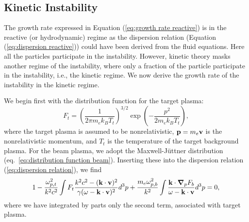 \documentclass[usenatbib,iop,apj,numberedappendix]{aeb_emulateapj_2015}
\newcommand\bmath[1] {\mbox{\boldmath$\rm #1$}}
\newcommand{\vel}{\ensuremath{\bmath{v}}}
\newcommand{\pmom}{\ensuremath{\bmath{p}}}
\newcommand{\gradp}{\ensuremath{\bmath{\nabla}_p}}
\newcommand{\betavec}{\ensuremath{\bmath{\beta}}}
\newcommand{\kvec}{\ensuremath{\bmath{k}}}
\newcommand{\betabeam}{\ensuremath{\bmath{\beta}_{\rm b}}}
\newcommand{\gammabeam}{\ensuremath{\gamma_{\rm b}}}
\begin{document}
\subsection{Kinetic Instability}

The growth rate expressed in Equation (\ref{eq:growth rate reactive}) is in the reactive (or hydrodynamic) regime as the dispersion relation (Equation (\ref{eq:dispersion reactive})) could have been derived from the fluid equations.  Here all the particles participate in the instability.  However, kinetic theory masks another regime of the instability, where only a fraction of the particle participate in the instability, i.e., the kinetic regime.  We now derive the growth rate of the instability in the kinetic regime.  

We begin first with the distribution function for the target plasma:
\begin{equation}
 F_t = \left(\frac{1}{2\pi m_e k_B T_t}\right)^{3/2}\exp\left(-\frac{p^2}{2m_e k_B T_t}\right),
\end{equation}
where the target plasma is assumed to be nonrelativistic, $\bmath{p}=m_e\vel$ is the nonrelativistic momentum,  and $T_t$ is the temperature of the target background plasma.
For the beam plasma, we adopt the Maxwell-J{\"u}ttner distribution (eq.~\ref{eq:distribution function beam}).
Inserting these into the dispersion relation (\ref{eq:dispersion relation}), we find
\begin{equation}\label{eq:dispersion kinetic}
 1 - \frac{\omega_{p,t}^2}{k^2c^2}\int F_t\frac{k^2c^2 - (\kvec\cdot\vel)^2}{\gamma(\omega - \kvec\cdot\vel)^2} d^3p + \frac{m_e\omega_{p,b}^2}{k^2}\int \frac{\kvec\cdot\gradp F_b}{\omega - \kvec\cdot\vel}d^3p  = 0,
\end{equation}
where we have integrated by parts only the second term, associated with target plasma. 
\end{document}
